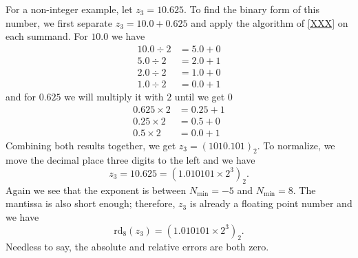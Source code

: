 \begin{exmp}
    For a non-integer example, let \(z_3 = 10.625\). To find the binary form of this number, we first separate \(z_3 = 10.0 + 0.625\) and apply the algorithm of \ref{XXX} on each summand. For \(10.0\) we have
    \begin{align*}
        10.0 \div 2 &= 5.0 + 0 \\
        5.0 \div 2 &= 2.0 + 1 \\
        2.0 \div 2 &= 1.0 + 0 \\
        1.0 \div 2 &= 0.0 + 1
    \end{align*}
    and for \(0.625\) we will multiply it with \(2\) until we get \(0\)
    \begin{align*}
        0.625 \times 2 &= 0.25 + 1 \\
        0.25 \times 2 &= 0.5 + 0 \\
        0.5 \times 2 &= 0.0 + 1
    \end{align*}
    Combining both results together, we get \(z_3 = (1010.101)_2\). To normalize, we move the decimal place three digits to the left and we have
    \begin{equation*}
        z_3 = 10.625 = (1.010101 \times 2^3)_2 \text{.}
    \end{equation*}
    Again we see that the exponent is between \(N_{\text{min}} = -5\) and \(N_{\text{min}} = 8\). The mantissa is also short enough; therefore, \(z_3\) is already a floating point number and we have
    \begin{equation*}
        \text{rd}_8(z_3) = (1.010101 \times 2^3)_2 \text{.}
    \end{equation*}
    Needless to say, the absolute and relative errors are both zero.
\end{exmp}
%
%

